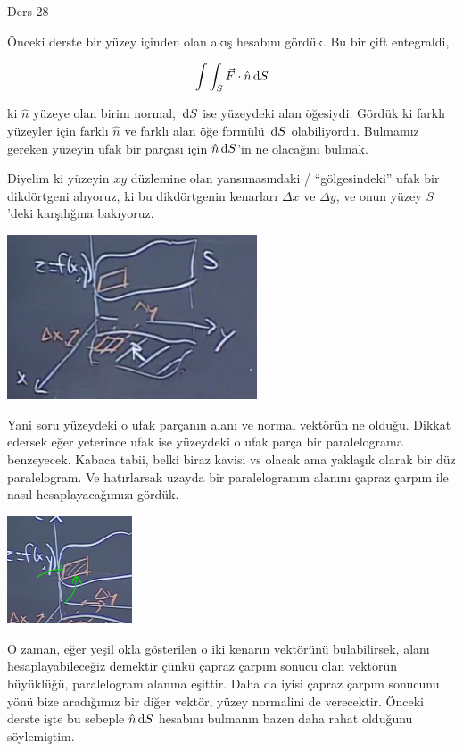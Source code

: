 \documentclass[12pt,fleqn]{article}\usepackage{../../common}
\begin{document}
Ders 28

Önceki derste bir yüzey içinden olan akış hesabını gördük. Bu bir çift
entegraldi,

$$
\int \int_S \vec{F} \cdot \hat{n} \,\mathrm{d} S
$$

ki $\hat{n}$ yüzeye olan birim normal, $\,\mathrm{d} S$ ise yüzeydeki alan öğesiydi.
Gördük ki farklı yüzeyler için farklı $\hat{n}$ ve farklı alan öğe formülü $\,\mathrm{d}
S$ olabiliyordu. Bulmamız gereken yüzeyin ufak bir parçası için $\hat{n} \,\mathrm{d}
S$'in ne olacağını bulmak.

Diyelim ki yüzeyin $xy$ düzlemine olan yansımasındaki / ``gölgesindeki'' ufak
bir dikdörtgeni alıyoruz, ki bu dikdörtgenin kenarları $\Delta x$ ve $\Delta y$,
ve onun yüzey $S$'deki karşılığına bakıyoruz.

\includegraphics[width=20em]{calc_multi_28_01.png}

Yani soru yüzeydeki o ufak parçanın alanı ve normal vektörün ne olduğu. Dikkat
edersek eğer yeterince ufak ise yüzeydeki o ufak parça bir paralelograma
benzeyecek. Kabaca tabii, belki biraz kavisi vs olacak ama yaklaşık olarak
bir düz paralelogram. Ve hatırlarsak uzayda bir paralelogramın alanını
çapraz çarpım ile nasıl hesaplayacağımızı gördük.

\includegraphics[width=10em]{calc_multi_28_02.png}

O zaman, eğer yeşil okla gösterilen o iki kenarın vektörünü bulabilirsek, alanı
hesaplayabileceğiz demektir çünkü çapraz çarpım sonucu olan vektörün büyüklüğü,
paralelogram alanına eşittir. Daha da iyisi çapraz çarpım sonucunu yönü bize
aradığımız bir diğer vektör, yüzey normalini de verecektir. Önceki derste işte
bu sebeple $\hat{n} \,\mathrm{d} S$ hesabını bulmanın bazen daha rahat olduğunu
söylemiştim.
\end{document}
